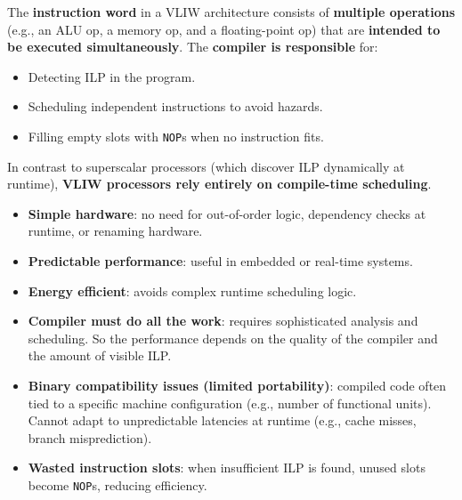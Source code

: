 \highspace
The \textbf{instruction word} in a VLIW architecture consists of \textbf{multiple operations} (e.g., an ALU op, a memory op, and a floating-point op) that are \textbf{intended to be executed simultaneously}. The \textbf{compiler is responsible} for:
\begin{itemize}
    \item Detecting ILP in the program.
    \item Scheduling independent instructions to avoid hazards.
    \item Filling empty slots with \texttt{NOP}s when no instruction fits.
\end{itemize}
In contrast to superscalar processors (which discover ILP dynamically at runtime), \textbf{VLIW processors rely entirely on compile-time scheduling}.
\begin{itemize}
    \item[\textcolor{Green3}{\faIcon{check}}] \textcolor{Green3}{\textbf{Simple hardware}}: no need for out-of-order logic, dependency checks at runtime, or renaming hardware.

    \item[\textcolor{Green3}{\faIcon{check}}] \textcolor{Green3}{\textbf{Predictable performance}}: useful in embedded or real-time systems.

    \item[\textcolor{Green3}{\faIcon{check}}] \textcolor{Green3}{\textbf{Energy efficient}}: avoids complex runtime scheduling logic.

    \item[\textcolor{Red2}{\faIcon{times}}] \textcolor{Red2}{\textbf{Compiler must do all the work}}: requires sophisticated analysis and scheduling. So the performance depends on the quality of the compiler and the amount of visible ILP.
    
    \item[\textcolor{Red2}{\faIcon{times}}] \textcolor{Red2}{\textbf{Binary compatibility issues (limited portability)}}: compiled code often tied to a specific machine configuration (e.g., number of functional units). Cannot adapt to unpredictable latencies at runtime (e.g., cache misses, branch misprediction).
    
    \item[\textcolor{Red2}{\faIcon{times}}] \textcolor{Red2}{\textbf{Wasted instruction slots}}: when insufficient ILP is found, unused slots become \texttt{NOP}s, reducing efficiency.
\end{itemize}

